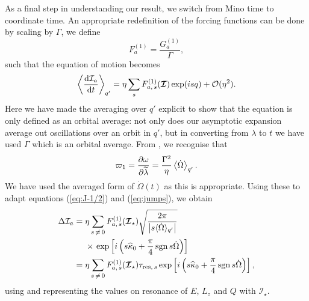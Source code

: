As a final step in understanding our result, we switch from Mino time to coordinate time. An appropriate redefinition of the forcing functions can be done by scaling by $\Gamma$, we define
\begin{equation}
F_a^{(1)} = \dfrac{G_a^{(1)}}{\Gamma},
\end{equation}
such that the equation of motion becomes
\begin{equation}
\left\langle \dfrac{\mathrm{d} {\mathcal{I}_a}}{\mathrm{d} {t}}\right\rangle_{q'} =  \eta\sum_s F_{a,\,s}^{(1)}(\boldsymbol{\mathcal{I}})\exp(is q) + \mathcal{O}({\eta^2}).
\end{equation}
Here we have made the averaging over $q'$ explicit to show that the equation is only defined as an orbital average: not only does our asymptotic expansion average out oscillations over an orbit in $q'$, but in converting from $\lambda$ to $t$ we have used $\Gamma$ which is an orbital average.
From , we recognise that
\begin{equation}
\varpi_1 = \dfrac{\partial {\omega}}{\partial {\widetilde{\lambda}}} = \dfrac{\Gamma^2}{\eta}\left\langle\dot{\Omega}\right\rangle_{q'}.
\end{equation}
We have used the averaged form of $\dot{\Omega}(t)$ as this is appropriate. Using these to adapt equations (\ref{eq:J-1/2}) and (\ref{eq:jumps}), we obtain
\begin{align}
\Delta \mathcal{I}_a = {} & \eta\sum_{s\,\neq\,0}F_{a,\,s}^{(1)}(\boldsymbol{\mathcal{I}}_\star)\sqrt{\dfrac{2\pi}{\left|s \langle\dot{\Omega}\rangle_{q'}\right|}} \nonumber \\*
 {} & \times \left.\exp\left[i\left(s \widehat{\kappa}_0 + \dfrac{\pi}{4}\operatorname{sgn} s\dot{\Omega}\right)\right]\right. \\
 = {} & \eta\sum_{s\,\neq\,0}F_{a,\,s}^{(1)}(\boldsymbol{\mathcal{I}}_\star)\tau_{\mathrm{res},\,s}\exp\left[i\left(s \widehat{\kappa}_0 + \dfrac{\pi}{4} \operatorname{sgn} s\dot{\Omega} \right)\right],
\end{align}
using  and representing the values on resonance of $E$, $L_z$ and $Q$ with $\boldsymbol{\mathcal{I}}_\star$.